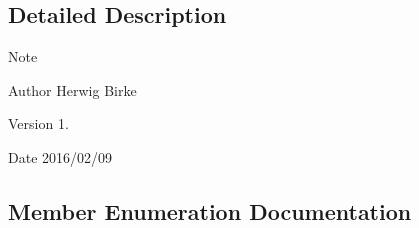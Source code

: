 \subsection{Detailed Description}
\begin{DoxyNote}{Note}

\end{DoxyNote}
\begin{DoxyAuthor}{Author}
Herwig Birke
\end{DoxyAuthor}
\begin{DoxyVersion}{Version}
1.
\end{DoxyVersion}
\begin{DoxyDate}{Date}
2016/02/09 
\end{DoxyDate}


\subsection{Member Enumeration Documentation}
